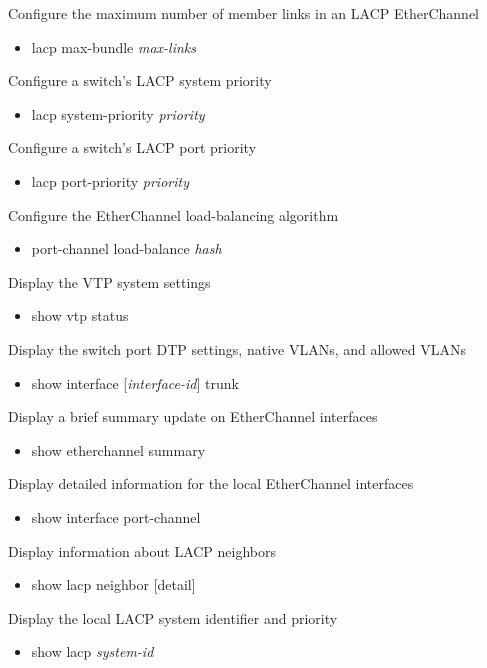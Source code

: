\documentclass{article}
\begin{document}
Configure the maximum number of member links in an LACP EtherChannel
\begin{itemize}
\item lacp max-bundle \textit{max-links}
\end{itemize}

Configure a switch's LACP system priority
\begin{itemize}
\item lacp system-priority \textit{priority}
\end{itemize}

Configure a switch's LACP port priority
\begin{itemize}
\item lacp port-priority \textit{priority}
\end{itemize}

Configure the EtherChannel load-balancing algorithm
\begin{itemize}
\item port-channel load-balance \textit{hash}
\end{itemize}

Display the VTP system settings
\begin{itemize}
\item show vtp status
\end{itemize}

Display the switch port DTP settings, native VLANs, and allowed VLANs
\begin{itemize}
\item show interface [\textit{interface-id}] trunk
\end{itemize}

Display a brief summary update on EtherChannel interfaces
\begin{itemize}
\item show etherchannel summary
\end{itemize}

Display detailed information for the local EtherChannel interfaces
\begin{itemize}
\item show interface port-channel
\end{itemize}


Display information about LACP neighbors
\begin{itemize}
\item show lacp neighbor [detail]
\end{itemize}

Display the local LACP system identifier and priority
\begin{itemize}
\item show lacp \textit{system-id}
\end{itemize}
\end{document}
